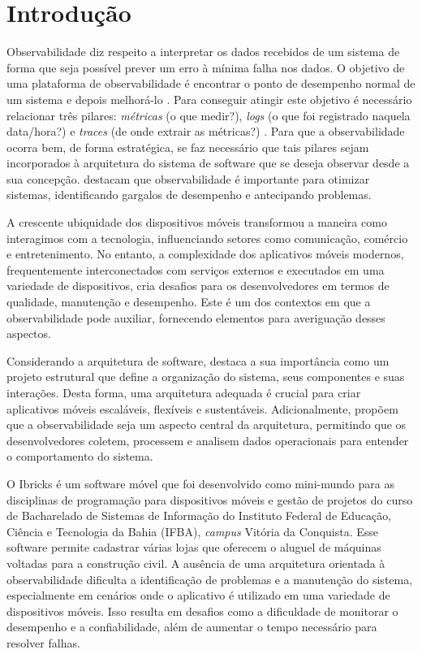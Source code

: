\documentclass[12pt]{article}
\begin{document}
\section{Introdução}

Observabilidade diz respeito a interpretar os dados recebidos de um sistema de forma que seja possível prever um erro à mínima falha nos dados. O objetivo de uma plataforma de observabilidade é encontrar o ponto de desempenho normal de um sistema e depois melhorá-lo \cite{dos2022observabilidade}. Para conseguir atingir este objetivo é necessário relacionar três pilares: \textit{métricas} (o que medir?), \textit{logs} (o que foi registrado naquela data/hora?) e \textit{traces} (de onde extrair as métricas?) \cite{dos2022observabilidade}. Para que a observabilidade ocorra bem, de forma estratégica, se faz necessário que tais pilares sejam incorporados à arquitetura do sistema de software que se deseja observar desde a sua concepção. \cite{majors2022observability} destacam que observabilidade é importante para otimizar sistemas, identificando gargalos de desempenho e antecipando problemas. 

A crescente ubiquidade dos dispositivos móveis transformou a maneira como interagimos com a tecnologia, influenciando setores como comunicação, comércio e entretenimento. No entanto, a complexidade dos aplicativos móveis modernos, frequentemente interconectados com serviços externos e executados em uma variedade de dispositivos, cria desafios para os desenvolvedores em termos de qualidade, manutenção e desempenho. Este é um dos contextos em que a observabilidade pode auxiliar, fornecendo elementos para averiguação desses aspectos.

Considerando a arquitetura de software, \cite{pressman2005software} destaca a sua importância como um projeto estrutural que define a organização do sistema, seus componentes e suas interações. Desta forma, uma arquitetura adequada é crucial para criar aplicativos móveis escaláveis, flexíveis e sustentáveis. Adicionalmente, \cite{dos2022observabilidade} propõem que a observabilidade seja um aspecto central da arquitetura, permitindo que os desenvolvedores coletem, processem e analisem dados operacionais para entender o comportamento do sistema. 

O Ibricks é um software móvel que foi desenvolvido como mini-mundo para as disciplinas de programação para dispositivos móveis e gestão de projetos do curso de Bacharelado de Sistemas de Informação do Instituto Federal de Educação, Ciência e Tecnologia da Bahia (IFBA), \textit{campus} Vitória da Conquista. Esse software permite cadastrar várias lojas que oferecem o aluguel de máquinas voltadas para a construção civil. A ausência de uma arquitetura orientada à observabilidade dificulta a identificação de problemas e a manutenção do sistema, especialmente em cenários onde o aplicativo é utilizado em uma variedade de dispositivos móveis. Isso resulta em desafios como a dificuldade de monitorar o desempenho e a confiabilidade, além de aumentar o tempo necessário para resolver falhas.
\end{document}
